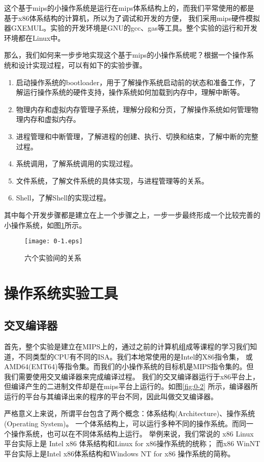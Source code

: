 这个基于mips的小操作系统是运行在mips体系结构上的，而我们平常使用的都是基于x86体系结构的计算机，所以为了调试和开发的方便，
我们采用mips硬件模拟器GXEMUL。实验的开发环境是GNU的gcc、gas等工具。整个实验的运行和开发环境都在Linux中。

那么，我们如何来一步步地实现这个基于mips的小操作系统呢？根据一个操作系统和设计实现过程，可以有如下的实验步骤。
\begin{enumerate}
  \item 启动操作系统的bootloader，用于了解操作系统启动前的状态和准备工作，了解运行操作系统的硬件支持，操作系统如何加载到内存中，理解中断等。
  \item 物理内存和虚拟内存管理子系统，理解分段和分页，了解操作系统如何管理物理内存和虚拟内存。
  \item 进程管理和中断管理，了解进程的创建、执行、切换和结束，了解中断的完整过程。
  \item 系统调用，了解系统调用的实现过程。
  \item 文件系统，了解文件系统的具体实现，与进程管理等的关系。
  \item Shell，了解Shell的实现过程。
\end{enumerate}
其中每个开发步骤都是建立在上一个步骤之上，一步一步最终形成一个比较完善的小操作系统，如图\ref{fig:0-1}所示。

\begin{figure}[htbp]
  \centering
  \texttt{[image: 0-1.eps]}
  \caption{六个实验间的关系}\label{fig:0-1}
\end{figure}

\section{操作系统实验工具}

\subsection{交叉编译器}
首先，整个实验是建立在MIPS上的，通过之前的计算机组成等课程的学习我们知道，不同类型的CPU有不同的ISA。我们本地常使用的是Intel的X86指令集，
或AMD64(EMT64)等指令集。而我们的小操作系统的目标机是MIPS指令集的。但我们需要使用交叉编译器来完成编译过程。
我们的交叉编译器运行于x86平台上，但编译产生的二进制文件却是在mips平台上运行的。如图\ref{fig:0-2}
所示，编译器所运行的平台与其编译出来的程序的平台不同，因此叫做交叉编译器。

\begin{note}
严格意义上来说，所谓平台包含了两个概念：体系结构(Architecture)、操作系统(Operating System)。
一个体系结构上，可以运行多种不同的操作系统。而同一个操作系统，也可以在不同体系结构上运行。
举例来说，我们常说的 x86 Linux 平台实际上是 Intel x86 体系结构和Linux for x86操作系统的统称；
而x86 WinNT平台实际上是Intel x86体系结构和Windows NT for x86 操作系统的简称。
\end{note}

